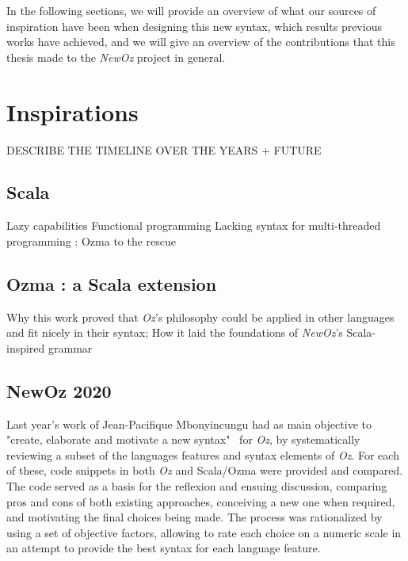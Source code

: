 In the following sections, we will provide an overview of what our sources of inspiration have been when designing this new syntax, which results previous works have achieved, and we will give an overview of the contributions that this thesis made to the \textit{NewOz} project in general.

\section{Inspirations}\label{sec:ch1-inspirations}

DESCRIBE THE TIMELINE OVER THE YEARS + FUTURE

\subsection{Scala}\label{subsec:ch1-scala}
Lazy capabilities\newline
Functional programming\newline
\newline
Lacking syntax for multi-threaded programming : Ozma to the rescue

\subsection{Ozma : a Scala extension}\label{subsec:ch1-ozma}
Why this work proved that \textit{Oz}'s philosophy could be applied in other languages and fit nicely in their syntax;
How it laid the foundations of \textit{NewOz}'s Scala-inspired grammar

\subsection{NewOz 2020}\label{subsec:ch1-newoz2020}
Last year's work of Jean-Pacifique Mbonyincungu had as main objective to "create, elaborate and motivate a new syntax"~\cite{jpthesis} for \textit{Oz}, by systematically reviewing a subset of the languages features and syntax elements of \textit{Oz}.
For each of these, code snippets in both \textit{Oz} and Scala/Ozma were provided and compared.
The code served as a basis for the reflexion and ensuing discussion, comparing pros and cons of both existing approaches, conceiving a new one when required, and motivating the final choices being made.
The process was rationalized by using a set of objective factors, allowing to rate each choice on a numeric scale in an attempt to provide the best syntax for each language feature.\newline

